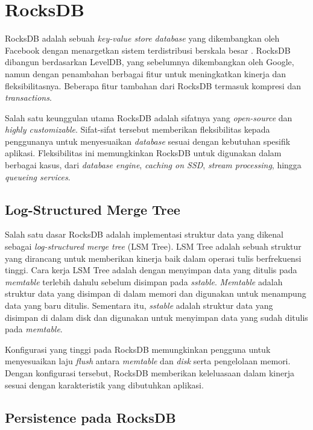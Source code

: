 \section{RocksDB}

RocksDB adalah sebuah \textit{key-value store database} yang dikembangkan oleh Facebook dengan menargetkan sistem terdistribusi berskala besar \parencite{dong2021rocksdb}. RocksDB dibangun berdasarkan LevelDB, yang sebelumnya dikembangkan oleh Google, namun dengan penambahan berbagai fitur untuk meningkatkan kinerja dan fleksibilitasnya. Beberapa fitur tambahan dari RocksDB termasuk kompresi dan \textit{transactions}.

Salah satu keunggulan utama RocksDB adalah sifatnya yang \textit{open-source} dan \textit{highly customizable}. Sifat-sifat tersebut memberikan fleksibilitas kepada penggunanya untuk menyesuaikan \textit{database} sesuai dengan kebutuhan spesifik aplikasi. Fleksibilitas ini memungkinkan RocksDB untuk digunakan dalam berbagai kasus, dari \textit{database engine}, \textit{caching on SSD}, \textit{stream processing}, hingga \textit{queueing services}.

\subsection{Log-Structured Merge Tree}

Salah satu dasar RocksDB adalah implementasi struktur data yang dikenal sebagai \textit{log-structured merge tree} (LSM Tree). LSM Tree adalah sebuah struktur yang dirancang untuk memberikan kinerja baik dalam operasi tulis berfrekuensi tinggi. Cara kerja LSM Tree adalah dengan menyimpan data yang ditulis pada \textit{memtable} terlebih dahulu sebelum disimpan pada \textit{sstable}. \textit{Memtable} adalah struktur data yang disimpan di dalam memori dan digunakan untuk menampung data yang baru ditulis. Sementara itu, \textit{sstable} adalah struktur data yang disimpan di dalam disk dan digunakan untuk menyimpan data yang sudah ditulis pada \textit{memtable}.

Konfigurasi yang tinggi pada RocksDB memungkinkan pengguna untuk menyesuaikan laju \textit{flush} antara \textit{memtable} dan \textit{disk} serta pengelolaan memori. Dengan konfigurasi tersebut, RocksDB memberikan keleluasaan dalam kinerja sesuai dengan karakteristik yang dibutuhkan aplikasi.

\subsection{Persistence pada RocksDB}

